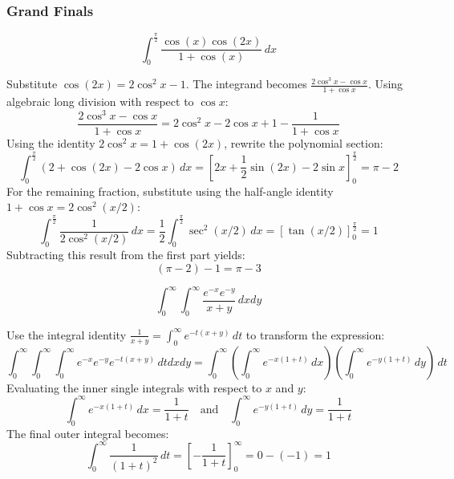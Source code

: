 \subsubsection*{Grand Finals}
\begin{questions}
    \question
    \[ \int_{0}^{\frac{\pi}{2}} \frac{\cos(x)\cos(2x)}{1 + \cos(x)} \, dx \]
    \begin{solution}
        Substitute $\cos(2x) = 2\cos^2 x - 1$. The integrand becomes $\frac{2\cos^3 x - \cos x}{1 + \cos x}$. Using algebraic long division with respect to $\cos x$:
        \[ \frac{2\cos^3 x - \cos x}{1 + \cos x} = 2\cos^2 x - 2\cos x + 1 - \frac{1}{1 + \cos x} \]
        Using the identity $2\cos^2 x = 1 + \cos(2x)$, rewrite the polynomial section:
        \[ \int_{0}^{\frac{\pi}{2}} \left( 2 + \cos(2x) - 2\cos x \right) \, dx = \left[ 2x + \frac{1}{2}\sin(2x) - 2\sin x \right]_{0}^{\frac{\pi}{2}} = \pi - 2 \]
        For the remaining fraction, substitute using the half-angle identity $1 + \cos x = 2\cos^2(x/2)$:
        \[ \int_{0}^{\frac{\pi}{2}} \frac{1}{2\cos^2(x/2)} \, dx = \frac{1}{2} \int_{0}^{\frac{\pi}{2}} \sec^2(x/2) \, dx = \left[ \tan(x/2) \right]_{0}^{\frac{\pi}{2}} = 1 \]
        Subtracting this result from the first part yields:
        \[ (\pi - 2) - 1 = \pi - 3 \]
    \end{solution}

    \question
    \[ \int_{0}^{\infty} \int_{0}^{\infty} \frac{e^{-x} e^{-y}}{x + y} \, dx dy \]
    \begin{solution}
        Use the integral identity $\frac{1}{x+y} = \int_{0}^{\infty} e^{-t(x+y)} \, dt$ to transform the expression:
        \[ \int_{0}^{\infty} \int_{0}^{\infty} \int_{0}^{\infty} e^{-x} e^{-y} e^{-t(x+y)} \, dt dx dy = \int_{0}^{\infty} \left( \int_{0}^{\infty} e^{-x(1+t)} \, dx \right) \left( \int_{0}^{\infty} e^{-y(1+t)} \, dy \right) \, dt \]
        Evaluating the inner single integrals with respect to $x$ and $y$:
        \[ \int_{0}^{\infty} e^{-x(1+t)} \, dx = \frac{1}{1+t} \quad \text{and} \quad \int_{0}^{\infty} e^{-y(1+t)} \, dy = \frac{1}{1+t} \]
        The final outer integral becomes:
        \[ \int_{0}^{\infty} \frac{1}{(1+t)^2} \, dt = \left[ -\frac{1}{1+t} \right]_{0}^{\infty} = 0 - (-1) = 1 \]
    \end{solution}


\end{questions}
